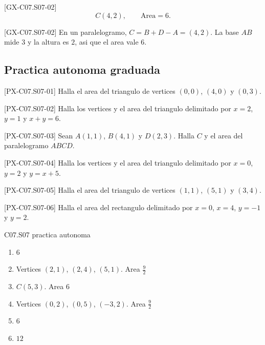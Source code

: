 \begin{shortanswer}{[GX-C07.S07-02]}
\[
C(4,2),
\qquad
\text{Area}=6.
\]
\end{shortanswer}

\begin{fullsolution}{[GX-C07.S07-02]}
En un paralelogramo, \(C=B+D-A=(4,2)\). La base \(AB\) mide \(3\) y la altura es \(2\), asi que
el area vale \(6\).
\end{fullsolution}

\subsection*{Practica autonoma graduada}
\begin{exercise}{[PX-C07.S07-01] Halla el area del triangulo de vertices \((0,0)\), \((4,0)\) y \((0,3)\).}
\end{exercise}
\begin{exercise}{[PX-C07.S07-02] Halla los vertices y el area del triangulo delimitado por \(x=2\), \(y=1\) y \(x+y=6\).}
\end{exercise}
\begin{exercise}{[PX-C07.S07-03] Sean \(A(1,1)\), \(B(4,1)\) y \(D(2,3)\). Halla \(C\) y el area del paralelogramo \(ABCD\).}
\end{exercise}
\begin{exercise}{[PX-C07.S07-04] Halla los vertices y el area del triangulo delimitado por \(x=0\), \(y=2\) y \(y=x+5\).}
\end{exercise}
\begin{exercise}{[PX-C07.S07-05] Halla el area del triangulo de vertices \((1,1)\), \((5,1)\) y \((3,4)\).}
\end{exercise}
\begin{exercise}{[PX-C07.S07-06] Halla el area del rectangulo delimitado por \(x=0\), \(x=4\), \(y=-1\) y \(y=2\).}
\end{exercise}

\begin{shortanswer}{C07.S07 practica autonoma}
\begin{enumerate}[label=\textbf{PX-C07.S07-\arabic*:}, leftmargin=*]
  \item \(6\)
  \item Vertices \((2,1)\), \((2,4)\), \((5,1)\). Area \(\frac{9}{2}\)
  \item \(C(5,3)\). Area \(6\)
  \item Vertices \((0,2)\), \((0,5)\), \((-3,2)\). Area \(\frac{9}{2}\)
  \item \(6\)
  \item \(12\)
\end{enumerate}
\end{shortanswer}

